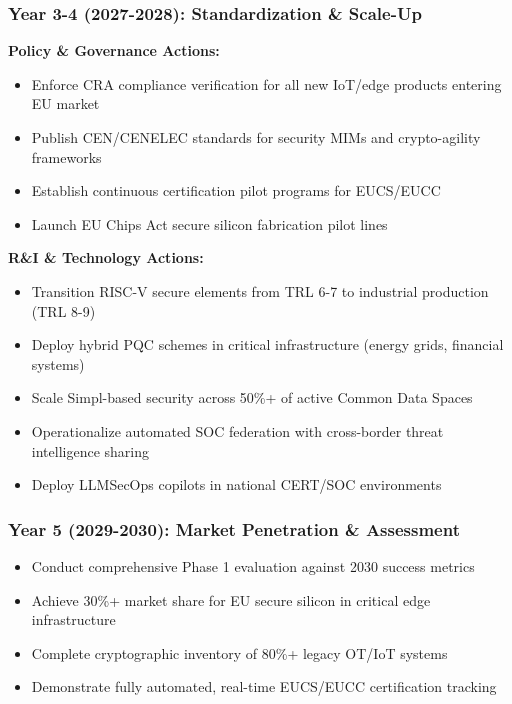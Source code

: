 \documentclass[12pt,a4paper]{report}
\begin{document}
\subsubsection*{Year 3-4 (2027-2028): Standardization \& Scale-Up}
\textbf{Policy \& Governance Actions:}
\begin{itemize}
    \item Enforce CRA compliance verification for all new IoT/edge products entering EU market
    \item Publish CEN/CENELEC standards for security MIMs and crypto-agility frameworks
    \item Establish continuous certification pilot programs for EUCS/EUCC
    \item Launch EU Chips Act secure silicon fabrication pilot lines
\end{itemize}

\textbf{R\&I \& Technology Actions:}
\begin{itemize}
    \item Transition RISC-V secure elements from TRL 6-7 to industrial production (TRL 8-9)
    \item Deploy hybrid PQC schemes in critical infrastructure (energy grids, financial systems)
    \item Scale Simpl-based security across 50\%+ of active Common Data Spaces
    \item Operationalize automated SOC federation with cross-border threat intelligence sharing
    \item Deploy LLMSecOps copilots in national CERT/SOC environments
\end{itemize}

\subsubsection*{Year 5 (2029-2030): Market Penetration \& Assessment}
\begin{itemize}
    \item Conduct comprehensive Phase 1 evaluation against 2030 success metrics
    \item Achieve 30\%+ market share for EU secure silicon in critical edge infrastructure
    \item Complete cryptographic inventory of 80\%+ legacy OT/IoT systems
    \item Demonstrate fully automated, real-time EUCS/EUCC certification tracking
\end{itemize}
\end{document}

